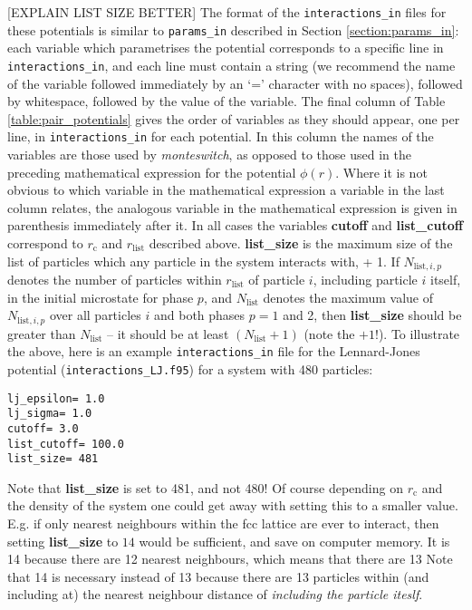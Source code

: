 \documentclass{report}
\begin{document}
[EXPLAIN LIST SIZE BETTER]
The format of the \texttt{interactions\_in} files for these potentials is similar to \texttt{params\_in} described in Section \ref{section:params_in}:
each variable which parametrises the potential corresponds to a specific line in \texttt{interactions\_in}, and each line must contain a string
(we recommend the name of the variable followed immediately by an `=' character with no spaces), followed by whitespace, followed by the value
of the variable. The final column of Table \ref{table:pair_potentials} gives the order of variables as they should appear, one per line, in
\texttt{interactions\_in} for each potential. In this column the names of the variables are those used by \emph{monteswitch}, as opposed to those
used in the preceding mathematical expression for the potential $\phi(r)$. Where it is not obvious to which variable in the mathematical expression
a variable in the last column relates, the analogous variable in the mathematical expression is given in parenthesis immediately after it. In all
cases the variables \textbf{cutoff} and \textbf{list\_cutoff} correspond to $r_{\text{c}}$ and $r_{\text{list}}$ described above. \textbf{list\_size} is the
maximum size of the list of particles which any particle in the system interacts with, + 1. If $N_{\text{list},i,p}$ denotes the number of particles within
$r_{\text{list}}$ of particle $i$, including particle $i$ itself,
in the initial microstate for phase $p$, and $N_{\text{list}}$ denotes the maximum value of $N_{\text{list},i,p}$ over all particles
$i$ and both phases $p=1$ and 2, then \textbf{list\_size} should be greater than $N_{\text{list}}$ -- it should be at least $(N_{\text{list}}+1)$ (note the
$+1$!). To illustrate the above, here is an example \texttt{interactions\_in} file for the Lennard-Jones potential (\texttt{interactions\_LJ.f95}) for
a system with 480 particles:
\begin{verbatim}
lj_epsilon= 1.0
lj_sigma= 1.0
cutoff= 3.0
list_cutoff= 100.0
list_size= 481
\end{verbatim}
Note that \textbf{list\_size} is set to 481, and not 480! Of course depending on $r_{\text{c}}$ and the density of the system one could get away with 
setting this to a smaller value. E.g. if only nearest neighbours within the fcc lattice are ever to interact, then setting \textbf{list\_size} to
$14$ would be sufficient, and save on computer memory. It is 14 because there are 12 nearest neighbours, which means that there are 13 
Note that 14 is necessary instead of 13 because there are 13 particles within (and including at)
the nearest neighbour distance of \emph{including the particle iteslf}.
\end{document}
